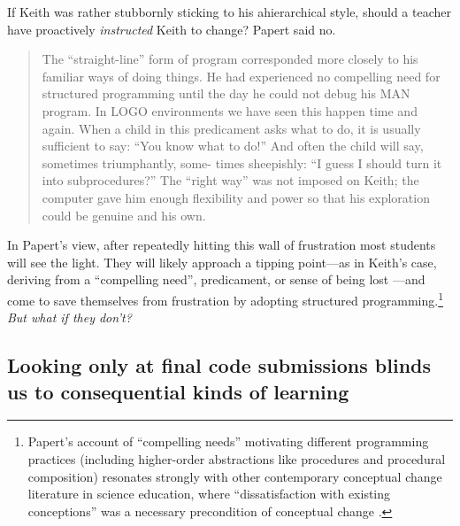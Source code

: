 If Keith was rather stubbornly sticking to his ahierarchical style, should a teacher have proactively \emph{instructed} Keith to change? Papert said no.

\begin{quote}
The ``straight-line'' form of program corresponded more closely to his familiar ways of doing things. He had experienced no compelling need for structured programming until the day he could not debug his MAN program. In LOGO environments we have seen this happen time and again. When a child in this predicament asks what to do, it is usually sufficient to say: ``You know what to do!'' And often the child will say, sometimes triumphantly, some- times sheepishly: ``I guess I should turn it into subprocedures?'' The ``right way'' was not imposed on Keith; the computer gave him enough flexibility and power so that his exploration could be genuine and his own. \citep[ p.~104]{papert_mindstorms_1980}
\end{quote}

In Papert's \citeyearpar{papert_mindstorms_1980} view, after repeatedly hitting this wall of frustration most students will see the light. They will likely approach a tipping point---as in Keith's case, deriving from a ``compelling need'', predicament, or sense of being lost \citep[ p.~104]{papert_mindstorms_1980}---and come to save themselves from frustration by adopting structured programming.\footnote{Papert's \citeyearpar[ p.~104]{papert_mindstorms_1980} account of ``compelling needs'' motivating different programming practices (including higher-order abstractions like procedures and procedural composition) resonates strongly with other contemporary conceptual change literature \citep{posner_accommodation_1982} in science education, where ``dissatisfaction with existing conceptions'' was a necessary precondition of conceptual change \citep[ p.~214]{posner_accommodation_1982}.} \emph{But what if they don't?}

\subsection{Looking only at final code submissions blinds us to consequential kinds of learning}\label{looking-only-at-final-code-submissions-blinds-us-to-consequential-kinds-of-learning}


